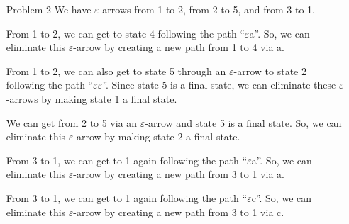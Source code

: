\documentclass[12pt,letterpaper]{article}
\begin{document}
\begin{enumerate}

    \item[Problem 2]
      We have $\varepsilon$-arrows from 1 to 2, from 2 to 5, and from 3 to 1.

      From 1 to 2, we can get to state 4 following the path ``$\varepsilon$a''.
      So, we can eliminate this $\varepsilon$-arrow by creating a new path from 1 to 4 via a.

      From 1 to 2, we can also get to state 5 through an $\varepsilon$-arrow to state 2 following the path ``$\varepsilon\varepsilon$''.
      Since state 5 is a final state, we can eliminate these $\varepsilon$-arrows by making state 1 a final state.

      We can get from 2 to 5 via an $\varepsilon$-arrow and state 5 is a final state.
      So, we can eliminate this $\varepsilon$-arrow by making state 2 a final state.

      From 3 to 1, we can get to 1 again following the path ``$\varepsilon$a''.
      So, we can eliminate this $\varepsilon$-arrow by creating a new path from 3 to 1 via a.

      From 3 to 1, we can get to 1 again following the path ``$\varepsilon$c''.
      So, we can eliminate this $\varepsilon$-arrow by creating a new path from 3 to 1 via c.


\end{enumerate}
\end{document}
